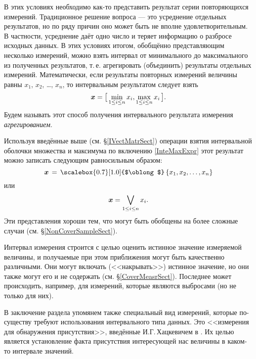 \documentclass[a5paper,openany]{book}
\newcommand{\mbf}[1]{\protect\text{\boldmath$#1$}}
\newcommand{\ih}{\scalebox{0.7}[1.0]{$\oblong$}}
\begin{document}
В этих условиях необходимо как-то представить результат серии повторяющихся измерений.  
Традиционное решение вопроса --- это усреднение отдельных результатов, но по ряду причин 
оно может быть не вполне удовлетворительным. В частности, усреднение даёт одно число 
и теряет информацию о разбросе исходных данных. В этих условиях итогом, обобщённо 
представляющим несколько измерений, можно взять интервал от минимального до максимального 
из полученных результатов, т.\,е. агрегировать (объединить) результаты отдельных измерений. 
Математически, если результаты повторных измерений 
величины равны $x_1$, $x_2$, \ldots, $x_n$, то интервальным результатом следует взять 
\begin{equation*} 
\mbf{x} = \bigl[\,\min_{1\leq i\leq n} x_{i}, \max_{1\leq i\leq n} x_{i}\,\bigr].  
\end{equation*} 
Будем называть этот способ получения интервального результата измерения 
\emph{агрегированием}. 
  
Используя введённые выше (см. \S\ref{IVectMatrSect}) операции взятия интервальной 
оболочки множества и максимума по включению \eqref{InteMaxExpr} этот результат 
можно записать следующим равносильным образом: 
\begin{equation*} 
\mbf{x}\, = \,\ih\,\{ x_1, x_2, \ldots, x_n\} 
\end{equation*} 
или 
\begin{equation*} 
\mbf{x} = \bigvee_{1\leq i\leq n} x_{i}.  
\end{equation*} 
Эти представления хороши тем, что могут быть обобщены на более сложные случаи 
(см. \S\ref{NonCoverSampleSect}).  
  
  
\smallskip   
Интервал измерения строится с целью оценить истинное значение измеряемой величины, 
и получаемые при этом приближения могут быть  качественно различными. Они могут 
включать (<<накрывать>>) истинное значение, но они также могут его и не содержать
(см. \S\ref{CoverMeasrSect}). Последнее может происходить, например, для измерений, 
которые являются выбросами (но не только для них). 
 
В заключение раздела упомянем также специальный вид измерений, которые по-существу 
требуют использования интервального типа данных. Это <<измерения для обнаружения 
присутствия>>, введённые И.Г.\,Хацкевичем в \cite{Khatskevich}. Их целью является 
установление факта присутствия интересующей нас величины в каком-то интервале 
значений. 
  
\end{document}

